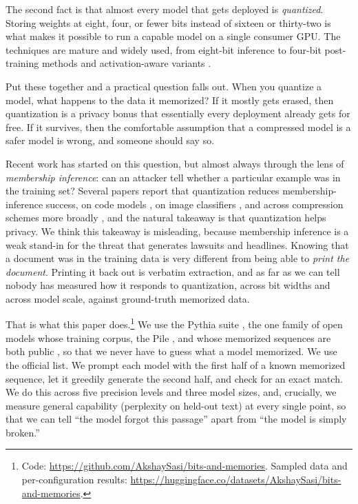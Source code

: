 \documentclass{article}
\begin{document}
The second fact is that almost every model that gets deployed is
\emph{quantized}. Storing weights at eight, four, or fewer bits instead of
sixteen or thirty-two is what makes it possible to run a capable model on a
single consumer GPU. The techniques are mature and widely used, from
eight-bit inference \citep{dettmers2022int8} to four-bit post-training
methods \citep{frantar2022gptq,dettmers2023qlora} and activation-aware
variants \citep{lin2023awq,xiao2023smoothquant}.

Put these together and a practical question falls out. When you quantize a
model, what happens to the data it memorized? If it mostly gets erased, then
quantization is a privacy bonus that essentially every deployment already
gets for free. If it survives, then the comfortable assumption that a
compressed model is a safer model is wrong, and someone should say so.

Recent work has started on this question, but almost always through the lens
of \emph{membership inference}: can an attacker tell whether a particular
example was in the training set? Several papers report that quantization
reduces membership-inference success, on code models
\citep{kumar2025quantcode}, on image classifiers \citep{anon2025bits}, and
across compression schemes more broadly \citep{li2026compleak}, and the
natural takeaway is that quantization helps privacy. We think this takeaway
is misleading, because membership inference is a weak stand-in for the threat
that generates lawsuits and headlines. Knowing that a document was in the
training data is very different from being able to \emph{print the document}.
Printing it back out is verbatim extraction, and as far as we can tell nobody
has measured how it responds to quantization, across bit widths and across
model scale, against ground-truth memorized data.

That is what this paper does.\footnote{Code: \url{https://github.com/AkshaySasi/bits-and-memories}. Sampled data and per-configuration results: \url{https://huggingface.co/datasets/AkshaySasi/bits-and-memories}.} We use the Pythia suite
\citep{biderman2023pythia}, the one family of open models whose training
corpus, the Pile \citep{gao2020pile}, and whose memorized sequences are both
public \citep{biderman2023emergent}, so that we never have to guess what a
model memorized. We use the official list. We prompt each model with the
first half of a known memorized sequence, let it greedily generate the
second half, and check for an exact match. We do this across five precision
levels and three model sizes, and, crucially, we measure general capability
(perplexity on held-out text) at every single point, so that we can tell
``the model forgot this passage'' apart from ``the model is simply broken.''
\end{document}
